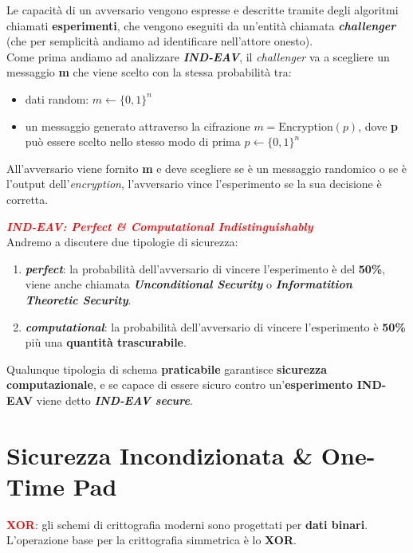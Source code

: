 \begin{flushleft}
    Le capacità di un avversario vengono espresse e descritte tramite degli algoritmi chiamati \textbf{esperimenti}, che vengono eseguiti da un'entità chiamata \textbf{\textit{challenger}} (che per semplicità andiamo ad identificare nell'attore onesto). \\
    Come prima andiamo ad analizzare \textbf{\textit{IND-EAV}}, il \textit{challenger} va a scegliere un messaggio \textbf{m} che viene scelto con la stessa probabilità tra:
    \begin{itemize}[nosep]
        \item dati random: $m \leftarrow \{0, 1\}^n$
        \item un messaggio generato attraverso la cifrazione $m = \text{Encryption}(p)$, dove \textbf{p} può essere scelto nello stesso modo di prima $p \leftarrow \{0, 1\}^n$
    \end{itemize}
    All'avversario viene fornito \textbf{m} e deve scegliere se è un messaggio randomico o se è l'output dell'\textit{encryption}, l'avversario vince l'esperimento se la sua decisione è corretta.
\end{flushleft}

\begin{flushleft}
    \textcolor{red}{\textbf{\textit{IND-EAV: Perfect \& Computational Indistinguishably}}} \\
    Andremo a discutere due tipologie di sicurezza:
    \begin{enumerate}[nosep]
        \item \textbf{\textit{perfect}}: la probabilità dell'avversario di vincere l'esperimento è del \textbf{50\%}, viene anche chiamata \textbf{\textit{Unconditional Security}} o \textbf{\textit{Informatition Theoretic Security}}.
        \item \textbf{\textit{computational}}: la probabilità dell'avversario di vincere l'esperimento è \textbf{50\%} più una \textbf{quantità trascurabile}.
    \end{enumerate}
    Qualunque tipologia di schema \textbf{praticabile} garantisce \textbf{sicurezza computazionale}, e se capace di essere sicuro contro un'\textbf{esperimento IND-EAV} viene detto \textbf{\textit{IND-EAV secure}}.
\end{flushleft}

\section{Sicurezza Incondizionata \& One-Time Pad}
\textcolor{red}{\textbf{XOR}}: gli schemi di crittografia moderni sono progettati per \textbf{dati binari}. L'operazione base per la crittografia simmetrica è lo \textbf{XOR}.

